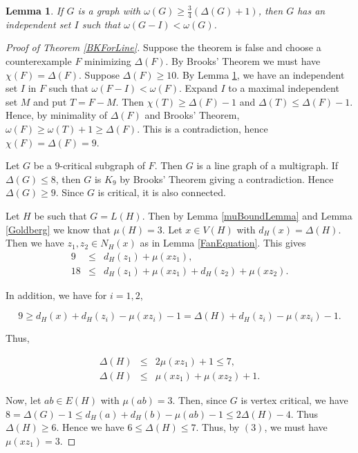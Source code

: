 \documentclass[12pt]{article}
\theoremstyle{plain}
\newtheorem{lem}[thm]{Lemma}
\theoremstyle{definition}
\theoremstyle{remark}
\begin{document}
\begin{lem}\label{HittingCliques}
If $G$ is a graph with $\omega(G) \geq \frac{3}{4}(\Delta(G) + 1)$, then $G$ has an independent set $I$ such that $\omega(G - I) < \omega(G)$.
\end{lem}

\begin{proof}[Proof of Theorem \ref{BKForLine}]

Suppose the theorem is false and choose a counterexample $F$ minimizing $\Delta(F)$.  By Brooks' Theorem we must have $\chi(F) = \Delta(F)$.  Suppose $\Delta(F) \geq 10$. By Lemma \ref{HittingCliques}, we have an independent set $I$ in $F$ such that $\omega(F - I) < \omega(F)$.  Expand $I$ to a maximal independent set $M$ and put $T = F - M$.  Then $\chi(T) \geq \Delta(F) - 1$ and $\Delta(T) \leq \Delta(F) - 1$.  Hence, by minimality of $\Delta(F)$ and Brooks' Theorem, $\omega(F) \geq \omega(T) + 1 \geq \Delta(F)$.  This is a contradiction, hence $\chi(F) = \Delta(F) = 9$.

Let $G$ be a $9$-critical subgraph of $F$.  Then $G$ is a line graph of a multigraph.  If $\Delta(G) \leq 8$, then $G$ is $K_9$ by Brooks' Theorem giving a contradiction.  Hence $\Delta(G) \geq 9$.  Since $G$ is critical, it is also connected. 

Let $H$ be such that $G = L(H)$.  Then by Lemma \ref{muBoundLemma} and Lemma \ref{Goldberg} we know that $\mu(H) = 3$. Let $x \in V(H)$ with $d_H(x) = \Delta(H)$.  Then we have $z_1, z_2 \in N_H(x)$ as in Lemma \ref{FanEquation}.  This gives
\begin{eqnarray}
9 &\leq& d_H(z_1) + \mu(xz_1), \\
18 &\leq& d_H(z_1) + \mu(xz_1) + d_H(z_2) + \mu(xz_2).
\end{eqnarray}

\noindent In addition, we have for $i = 1,2$, 

\[9 \geq d_H(x) + d_H(z_i) - \mu(xz_i) - 1 = \Delta(H) + d_H(z_i) - \mu(xz_i) - 1.\]

\noindent Thus,

\begin{eqnarray}
\Delta(H) &\leq& 2\mu(xz_1) + 1 \leq 7, \\
\Delta(H) &\leq& \mu(xz_1) + \mu(xz_2) + 1.
\end{eqnarray}

Now, let $ab \in E(H)$ with $\mu(ab) = 3$.  Then, since $G$ is vertex critical, we have $8 = \Delta(G) - 1 \leq d_H(a) + d_H(b) - \mu(ab) - 1 \leq 2\Delta(H) - 4$.  Thus $\Delta(H) \geq 6$.  Hence we have $6 \leq \Delta(H) \leq 7$.  Thus, by $(3)$, we must have $\mu(xz_1) = 3$.


\end{proof}
\end{document}
